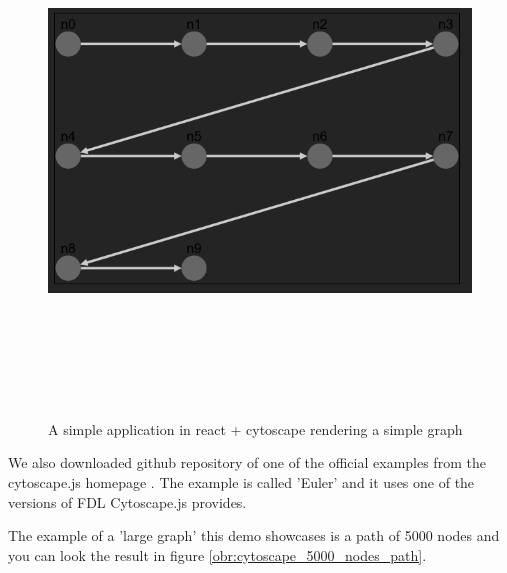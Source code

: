 \begin{figure}[p]\centering
  \includegraphics[width=140mm, height=140mm]{img/cytoscape_react_10_nodes_path.png}
  \caption{A simple application in react + cytoscape rendering a simple graph}
  \label{obr:cytoscape_react_test}
\end{figure}

We also downloaded github repository of one of the official examples from the cytoscape.js homepage \cite{cytoscapes_js_github}.
The example is called 'Euler' and it uses one of the versions of FDL Cytoscape.js provides.

The example of a 'large graph' this demo showcases is a path of 5000 nodes and you can look the result in figure \ref{obr:cytoscape_5000_nodes_path}.

